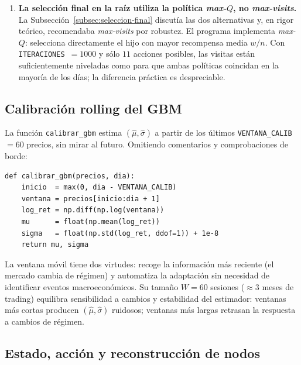 \begin{enumerate}
    \item[\textbf{(D4)}] \textbf{La selección final en la raíz utiliza la política \emph{max-$Q$}, no \emph{max-visits}.} La Subsección~\ref{subsec:seleccion-final} discutía las dos alternativas y, en rigor teórico, recomendaba \emph{max-visits} por robustez. El programa implementa \emph{max-$Q$}: selecciona directamente el hijo con mayor recompensa media $w/n$. Con \texttt{ITERACIONES}~$= 1000$ y sólo $11$ acciones posibles, las visitas están suficientemente niveladas como para que ambas políticas coincidan en la mayoría de los días; la diferencia práctica es despreciable.
\end{enumerate}

\subsection{Calibración rolling del GBM}
\label{subsec:calibracion}

La función \texttt{calibrar\_gbm} estima $(\hat\mu, \hat\sigma)$ a partir de los últimos \texttt{VENTANA\_CALIB}~$=60$ precios, sin mirar al futuro. Omitiendo comentarios y comprobaciones de borde:

\begin{lstlisting}[caption={Calibración rolling del GBM.}, label={lst:calibrar}]
def calibrar_gbm(precios, dia):
    inicio  = max(0, dia - VENTANA_CALIB)
    ventana = precios[inicio:dia + 1]
    log_ret = np.diff(np.log(ventana))
    mu      = float(np.mean(log_ret))
    sigma   = float(np.std(log_ret, ddof=1)) + 1e-8
    return mu, sigma
\end{lstlisting}

La ventana móvil tiene dos virtudes: recoge la información más reciente (el mercado cambia de régimen) y automatiza la adaptación sin necesidad de identificar eventos macroeconómicos. Su tamaño $W = 60$ sesiones ($\approx 3$ meses de trading) equilibra sensibilidad a cambios y estabilidad del estimador: ventanas más cortas producen $(\hat\mu, \hat\sigma)$ ruidosos; ventanas más largas retrasan la respuesta a cambios de régimen.

\subsection{Estado, acción y reconstrucción de nodos}
\label{subsec:estado-accion}

